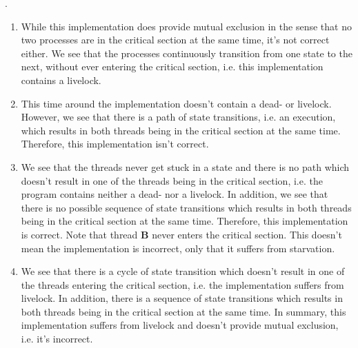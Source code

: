 \documentclass[main]{subfiles}
\begin{document}
\begin{ExerciseList}
        \Answer[ref={MEI}].\quad \\
        \begin{enumerate}[label=(\roman*)]
            \item \quad While this implementation does provide mutual exclusion in the sense that no two processes are in the critical section at the same time, it's not correct either. We see that the processes continuously transition from one state to the next, without ever entering the critical section, i.e. this implementation contains a livelock.
            \item \quad This time around the implementation doesn't contain a dead- or livelock. However, we see that there is a path of state transitions, i.e. an execution, which results in both threads being in the critical section at the same time. Therefore, this implementation isn't correct.
            \item \quad We see that the threads never get stuck in a state and there is no path which doesn't result in one of the threads being in the critical section, i.e. the program contains neither a dead- nor a livelock. In addition, we see that there is no possible sequence of state transitions which results in both threads being in the critical section at the same time. Therefore, this implementation is correct. Note that thread \textbf{B} never enters the critical section. This doesn't mean the implementation is incorrect, only that it suffers from starvation.
            \item \quad We see that there is a cycle of state transition which doesn't result in one of the threads entering the critical section, i.e. the implementation suffers from livelock. In addition, there is a sequence of state transitions which results in both threads being in the critical section at the same time. In summary, this implementation suffers from livelock and doesn't provide mutual exclusion, i.e. it's incorrect.
        \end{enumerate}
        

\end{ExerciseList}
\end{document}
